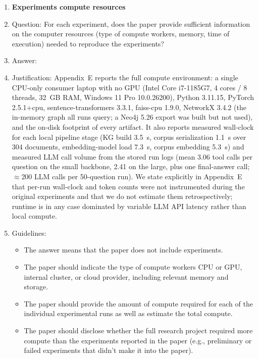 \begin{enumerate}
\item {\bf Experiments compute resources}
    \item[] Question: For each experiment, does the paper provide sufficient information on the computer resources (type of compute workers, memory, time of execution) needed to reproduce the experiments?
    \item[] Answer: \answerYes{}
    \item[] Justification: Appendix~E reports the full compute environment: a single CPU-only consumer laptop with no GPU (Intel Core i7-1185G7, 4 cores / 8 threads, 32~GB RAM, Windows 11 Pro 10.0.26200), Python 3.11.15, PyTorch 2.5.1+cpu, sentence-transformers 3.3.1, faiss-cpu 1.9.0, NetworkX 3.4.2 (the in-memory graph all runs query; a Neo4j 5.26 export was built but not used), and the on-disk footprint of every artifact. It also reports measured wall-clock for each local pipeline stage (KG build 3.5~s, corpus serialization 1.1~s over 304 documents, embedding-model load 7.3~s, corpus embedding 5.3~s) and measured LLM call volume from the stored run logs (mean 3.06 tool calls per question on the small backbone, 2.41 on the large, plus one final-answer call; $\approx$200 LLM calls per 50-question run). We state explicitly in Appendix~E that per-run wall-clock and token counts were not instrumented during the original experiments and that we do not estimate them retrospectively; runtime is in any case dominated by variable LLM API latency rather than local compute.
    \item[] Guidelines:
    \begin{itemize}
        \item The answer \answerNA{} means that the paper does not include experiments.
        \item The paper should indicate the type of compute workers CPU or GPU, internal cluster, or cloud provider, including relevant memory and storage.
        \item The paper should provide the amount of compute required for each of the individual experimental runs as well as estimate the total compute. 
        \item The paper should disclose whether the full research project required more compute than the experiments reported in the paper (e.g., preliminary or failed experiments that didn't make it into the paper). 
    \end{itemize}
    

\end{enumerate}
